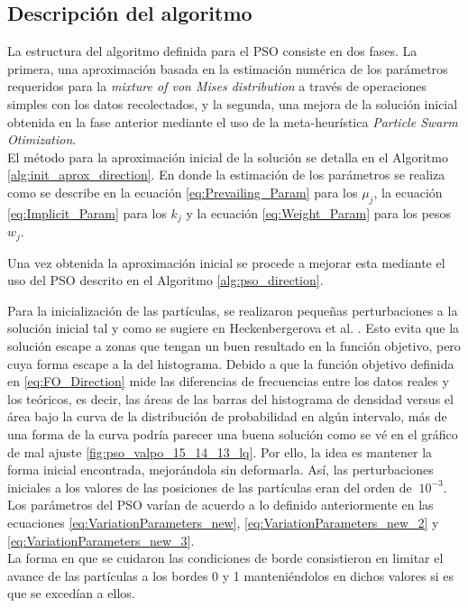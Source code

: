 \subsection{Descripción del algoritmo}
La estructura del algoritmo definida para el PSO consiste en dos fases. La primera, una aproximación basada en la estimación numérica de los parámetros requeridos para la \emph{mixture of von Mises distribution} a través de operaciones simples con los datos recolectados, y la segunda, una mejora de la solución inicial obtenida en la fase anterior mediante el uso de la meta-heurística \emph{Particle Swarm Otimization}. \\
El método para la aproximación inicial de la solución se detalla en el Algoritmo \ref{alg:init_aprox_direction}.
En donde la estimación de los parámetros se realiza como se describe en la ecuación \ref{eq:Prevailing_Param} para los $\mu_j$, la ecuación \ref{eq:Implicit_Param} para los $k_j$ y  la ecuación \ref{eq:Weight_Param} para los pesos $w_j$.

Una vez obtenida la aproximación inicial se procede a mejorar esta mediante el uso del PSO descrito en el Algoritmo \ref{alg:pso_direction}.

Para la inicialización de las partículas, se realizaron pequeñas perturbaciones a la solución inicial tal y como se sugiere en Heckenbergerova et al. \cite{Heckenbergerova15}. Esto evita que la solución escape a zonas que tengan un buen resultado en la función objetivo, pero cuya forma escape a la del histograma. Debido a que la función objetivo definida en \ref{eq:FO_Direction} mide las diferencias de frecuencias entre los datos reales y los teóricos, es decir, las áreas de las barras del histograma de densidad versus el área bajo la curva de la distribución de probabilidad en algún intervalo, más de una forma de la curva podría parecer una buena solución como se vé en el gráfico de mal ajuste \ref{fig:pso_valpo_15_14_13_lq}. Por ello, la idea es mantener la forma inicial encontrada, mejorándola sin deformarla. Así, las perturbaciones iniciales a los valores de las posiciones de las partículas eran del orden de $~ 10^{-3}$.\\
Los parámetros del PSO varían de acuerdo a lo definido anteriormente en las ecuaciones \ref{eq:VariationParameters_new}, \ref{eq:VariationParameters_new_2} y \ref{eq:VariationParameters_new_3}.\\
La forma en que se cuidaron las condiciones de borde consistieron en limitar el avance de las partículas a los bordes 0 y 1 manteniéndolos en dichos valores si es que se excedían a ellos.\\
